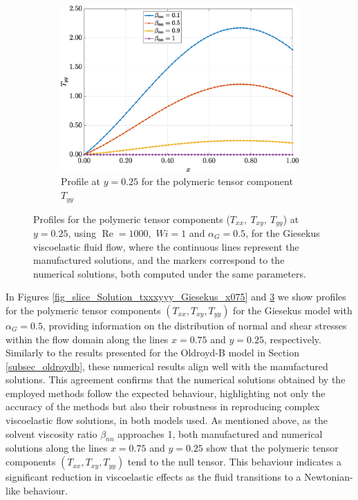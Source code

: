 \documentclass[preprint, 12pt]{elsarticle}
\begin{document}
\begin{figure}[H]
\begin{subfigure}[b]{.46\textwidth}
        \label{fig_slice_y_txy_2nd_Case1_giesekus_y025}
    \end{subfigure}
    \begin{subfigure}[b]{.46\textwidth}
        \includegraphics[width=\textwidth]{Slice_y_Tog_Numerical_NormErr_2nd_Betann_1_Re_1000_Wi_1_epsilon_0_xi_0_alphaG_0.5_Dt_1e-06_at_0.05_tipsim_1_MMS_12_x0.25y0.25_Tyy.eps}
        \caption{Profile at $y=0.25$ for the polymeric tensor component $T_{yy}$}
        \label{fig_slice_y_tyy_2nd_Case1_giesekus_y025}
    \end{subfigure}
    \vspace{0.02cm}
    \caption{Profiles for the polymeric tensor components ($T_{xx},~T_{xy},~T_{yy}$) at $y=0.25$, using $\operatorname{Re}=1000,$ $Wi=1$ and $\alpha_{G} = 0.5$, for the Giesekus viscoelastic fluid flow, where the continuous lines represent the manufactured solutions, and the markers correspond to the numerical solutions, both computed under the same parameters.\label{fig_slice_Solution_txxxyyy_Giesekus_y025}}
\end{figure}

In Figures \ref{fig_slice_Solution_txxxyyy_Giesekus_x075} and \ref{fig_slice_Solution_txxxyyy_Giesekus_y025} we show profiles for the polymeric tensor components $(T_{xx}, T_{xy}, T_{yy})$ for the Giesekus model with $\alpha_G = 0.5$, providing information on the distribution of normal and shear stresses within the flow domain along the lines $x=0.75$ and $y=0.25$, respectively. Similarly to the results presented for the Oldroyd-B model in Section \ref{subsec_oldroydb}, these numerical results align well with the manufactured solutions. This agreement confirms that the numerical solutions obtained by the employed methods follow the expected behaviour, highlighting not only the accuracy of the methods but also their robustness in reproducing complex viscoelastic flow solutions, in both models used. As mentioned above, as the solvent viscosity ratio $\beta_{nn}$ approaches 1, both manufactured and numerical solutions along the lines $x=0.75$ and \mbox{$y=0.25$} show that the polymeric tensor components $(T_{xx}, T_{xy}, T_{yy})$ tend to the null tensor. This behaviour indicates a significant reduction in viscoelastic effects as the fluid transitions to a Newtonian-like behaviour. 
\end{document}
